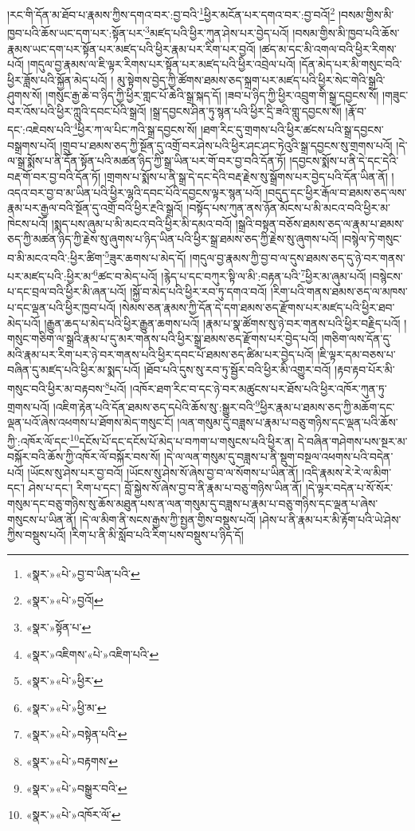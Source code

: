 །རང་གི་དོན་མ་ཐོབ་པ་རྣམས་ཀྱིས་དགའ་བར་:བྱ་བའི་\footnote{«སྣར་»«པེ་»བྱ་བ་ཡིན་པའི་}ཕྱིར་མངོན་པར་དགའ་བར་:བྱ་བའོ།\footnote{«སྣར་»«པེ་»བྱའོ།} །བསམ་གྱིས་མི་ཁྱབ་པའི་ཆོས་ཡང་དག་པར་:སྟོན་པར་\footnote{«སྣར་»སྟོན་པ་}མཛད་པའི་ཕྱིར་ཀུན་ཤེས་པར་བྱེད་པའོ། །བསམ་གྱིས་མི་ཁྱབ་པའི་ཆོས་རྣམས་ཡང་དག་པར་སྟོན་པར་མཛད་པའི་ཕྱིར་རྣམ་པར་རིག་པར་བྱའོ། །ཚད་མ་དང་མི་འགལ་བའི་ཕྱིར་རིགས་པའོ། །གདུལ་བྱ་རྣམས་ལ་ཇི་ལྟར་རིགས་པར་སྟོན་པར་མཛད་པའི་ཕྱིར་འབྲེལ་པའོ། །དོན་མེད་པར་མི་གསུང་བའི་ཕྱིར་ཟློས་པའི་སྐྱོན་མེད་པའོ། །
མུ་སྟེགས་བྱེད་ཀྱི་ཚོགས་ཐམས་ཅད་སྐྲག་པར་མཛད་པའི་ཕྱིར་སེང་གེའི་སྒྲའི་ཤུགས་སོ། །གསུང་རྒྱ་ཆེ་བ་ཉིད་ཀྱི་ཕྱིར་གླང་པོ་ཆེའི་སྒྲ་སྐད་དོ། །ཟབ་པ་ཉིད་ཀྱི་ཕྱིར་འབྲུག་གི་སྒྲ་དབྱངས་སོ། །གཟུང་བར་འོས་པའི་ཕྱིར་ཀླུའི་དབང་པོའི་སྒྲའོ། །སྒྲ་དབྱངས་ཤིན་ཏུ་སྙན་པའི་ཕྱིར་དྲི་ཟའི་གླུ་དབྱངས་སོ། །རྣོ་བ་དང་:འཇེབས་པའི་\footnote{«སྣར་»འཇིགས་«པེ་»འཇིག་པའི་}ཕྱིར་ཀ་ལ་པིང་ཀའི་སྒྲ་དབྱངས་སོ། །ཐག་རིང་དུ་གྲགས་པའི་ཕྱིར་ཚངས་པའི་སྒྲ་དབྱངས་བསྒྲགས་པའོ། །གྲུབ་པ་ཐམས་ཅད་ཀྱི་སྔོན་དུ་འགྲོ་བར་ཤེས་པའི་ཕྱིར་ཤང་ཤང་ཏེའུའི་སྒྲ་དབྱངས་སུ་གྲགས་པའོ། །དེ་ལ་སྒྲ་སྨོས་པ་ནི་དོན་སྟོན་པའི་མཚན་ཉིད་ཀྱི་སྒྲ་ཡིན་པར་གོ་བར་བྱ་བའི་དོན་ཏོ། །དབྱངས་སྨོས་པ་ནི་དེ་དང་དེའི་བརྡ་གོ་བར་བྱ་བའི་དོན་ཏོ། །གྲགས་པ་སྨོས་པ་ནི་སྒྲ་དེ་དང་དེའི་བརྡ་རྗེས་སུ་སྒྲོགས་པར་བྱེད་པའི་དོན་ཡིན་ནོ། །འདའ་བར་བྱ་བ་མ་ཡིན་པའི་ཕྱིར་ལྷའི་དབང་པོའི་དབྱངས་ལྟར་སྙན་པའོ། །བདུད་དང་ཕྱིར་རྒོལ་བ་ཐམས་ཅད་ལས་རྣམ་པར་རྒྱལ་བའི་སྔོན་དུ་འགྲོ་བའི་ཕྱིར་རྔའི་སྒྲའོ། །བསྟོད་པས་ཀུན་ནས་ཉོན་མོངས་པ་མི་མངའ་བའི་ཕྱིར་མ་ཁེངས་པའོ། །སྨད་པས་ཞུམ་པ་མི་མངའ་བའི་ཕྱིར་མི་དམའ་བའོ། །སྒྲའི་བསྟན་བཅོས་ཐམས་ཅད་ལ་རྣམ་པ་ཐམས་ཅད་ཀྱི་མཚན་ཉིད་ཀྱི་རྗེས་སུ་ཞུགས་པ་ཉིད་ཡིན་པའི་ཕྱིར་སྒྲ་ཐམས་ཅད་ཀྱི་རྗེས་སུ་ཞུགས་པའོ། །བསྙེལ་ཏེ་གསུང་བ་མི་མངའ་བའི་:ཕྱིར་ཚིག་\footnote{«སྣར་»«པེ་»ཕྱིར་}ཟུར་ཆགས་པ་མེད་དོ། །གདུལ་བྱ་རྣམས་ཀྱི་བྱ་བ་ལ་དུས་ཐམས་ཅད་དུ་ཉེ་བར་གནས་པར་མཛད་པའི་:ཕྱིར་མ་\footnote{«སྣར་»«པེ་»ཕྱི་མ་}ཚང་བ་མེད་པའོ། །རྙེད་པ་དང་བཀུར་སྟི་ལ་མི་:བརྟན་པའི་\footnote{«སྣར་»«པེ་»བསྟེན་པའི་}ཕྱིར་མ་ཞུམ་པའོ། །བསྙེངས་པ་དང་བྲལ་བའི་ཕྱིར་མི་ཞན་པའོ། །སྐྱོ་བ་མེད་པའི་ཕྱིར་རབ་ཏུ་དགའ་བའོ། །རིག་པའི་གནས་ཐམས་ཅད་ལ་མཁས་པ་དང་ལྡན་པའི་ཕྱིར་ཁྱབ་པའོ། །སེམས་ཅན་རྣམས་ཀྱི་དོན་དེ་དག་ཐམས་ཅད་རྫོགས་པར་མཛད་པའི་ཕྱིར་ཐབ་མེད་པའོ། །རྒྱུན་ཆད་པ་མེད་པའི་ཕྱིར་རྒྱུན་ཆགས་པའོ། །རྣམ་པ་སྣ་ཚོགས་སུ་ཉེ་བར་གནས་པའི་ཕྱིར་བརྗིད་པའོ། །གསུང་གཅིག་ལ་སྒྲའི་རྣམ་པ་དུ་མར་གནས་པའི་ཕྱིར་སྒྲ་ཐམས་ཅད་རྫོགས་པར་བྱེད་པའོ། །གཅིག་ལས་དོན་དུ་མའི་རྣམ་པར་རིག་པར་ཉེ་བར་གནས་པའི་ཕྱིར་དབང་པོ་ཐམས་ཅད་ཚིམ་པར་བྱེད་པའོ། །ཇི་ལྟར་དམ་བཅས་པ་བཞིན་དུ་མཛད་པའི་ཕྱིར་མ་སྨད་པའོ། །ཐོབ་པའི་དུས་སུ་རབ་ཏུ་སྦྱོར་བའི་ཕྱིར་མི་འགྱུར་བའོ། །རྟབ་རྟབ་པོར་མི་གསུང་བའི་ཕྱིར་མ་བརྟབས་\footnote{«སྣར་»«པེ་»བརྟགས་}པའོ། །འཁོར་ཐག་རིང་བ་དང་ཉེ་བར་མཚུངས་པར་ཐོས་པའི་ཕྱིར་འཁོར་ཀུན་ཏུ་གྲགས་པའོ། །འཇིག་རྟེན་པའི་དོན་ཐམས་ཅད་དཔེའི་ཆོས་སུ་:སྒྱུར་བའི་\footnote{«སྣར་»«པེ་»བསྒྱུར་བའི་}ཕྱིར་རྣམ་པ་ཐམས་ཅད་ཀྱི་མཆོག་དང་ལྡན་པའོ་ཞེས་འཕགས་པ་ཐོགས་མེད་གསུང་ངོ། །ལན་གསུམ་དུ་བཟླས་པ་རྣམ་པ་བཅུ་གཉིས་དང་ལྡན་པའི་ཆོས་ཀྱི་:འཁོར་ལོ་དང་\footnote{«སྣར་»«པེ་»འཁོར་ལོ་}དངོས་པོ་དང་དངོས་པོ་མེད་པ་བཀག་པ་གསུངས་པའི་ཕྱིར་ན། དེ་བཞིན་གཤེགས་པས་སྔར་མ་བསྐོར་བའི་ཆོས་ཀྱི་འཁོར་ལོ་བསྐོར་བས་སོ། །དེ་ལ་ལན་གསུམ་དུ་བཟླས་པ་ནི་སྡུག་བསྔལ་འཕགས་པའི་བདེན་པའོ། །ཡོངས་སུ་ཤེས་པར་བྱ་བའོ། །ཡོངས་སུ་ཤེས་སོ་ཞེས་བྱ་བ་ལ་སོགས་པ་ཡིན་ནོ། །འདི་རྣམས་རེ་རེ་ལ་མིག་དང་། ཤེས་པ་དང་། རིག་པ་དང་། བློ་སྐྱེས་སོ་ཞེས་བྱ་བ་ནི་རྣམ་པ་བཅུ་གཉིས་ཡིན་ནོ། །དེ་ལྟར་བདེན་པ་སོ་སོར་གསུམ་དང་བཅུ་གཉིས་སུ་ཆོས་མཐུན་པས་ན་ལན་གསུམ་དུ་བཟླས་པ་རྣམ་པ་བཅུ་གཉིས་དང་ལྡན་པ་ཞེས་གསུངས་པ་ཡིན་ནོ། །དེ་ལ་མིག་ནི་སངས་རྒྱས་ཀྱི་སྤྱན་གྱིས་བསྡུས་པའོ། །ཤེས་པ་ནི་རྣམ་པར་མི་རྟོག་པའི་ཡེ་ཤེས་ཀྱིས་བསྡུས་པའོ། །རིག་པ་ནི་མི་སློབ་པའི་རིག་པས་བསྡུས་པ་ཉིད་དོ། 